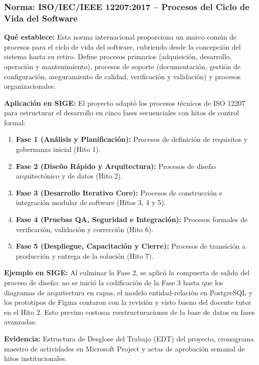 \documentclass[12pt,a4paper]{article}
\begin{document}
\subsubsection{Norma: ISO/IEC/IEEE 12207:2017 -- Procesos del Ciclo de Vida del Software}

\textbf{Qué establece:}
Esta norma internacional proporciona un marco común de procesos para el ciclo de vida del software, cubriendo desde la concepción del sistema hasta su retiro. Define procesos primarios (adquisición, desarrollo, operación y mantenimiento), procesos de soporte (documentación, gestión de configuración, aseguramiento de calidad, verificación y validación) y procesos organizacionales.

\textbf{Aplicación en SIGE:}
El proyecto adaptó los procesos técnicos de ISO 12207 para estructurar el desarrollo en cinco fases secuenciales con hitos de control formal:
\begin{enumerate}[leftmargin=1.5em, itemsep=2pt]
    \item \textbf{Fase 1 (Análisis y Planificación):} Procesos de definición de requisitos y gobernanza inicial (Hito 1).
    \item \textbf{Fase 2 (Diseño Rápido y Arquitectura):} Procesos de diseño arquitectónico y de datos (Hito 2).
    \item \textbf{Fase 3 (Desarrollo Iterativo Core):} Procesos de construcción e integración modular de software (Hitos 3, 4 y 5).
    \item \textbf{Fase 4 (Pruebas QA, Seguridad e Integración):} Procesos formales de verificación, validación y corrección (Hito 6).
    \item \textbf{Fase 5 (Despliegue, Capacitación y Cierre):} Procesos de transición a producción y entrega de la solución (Hito 7).
\end{enumerate}

\textbf{Ejemplo en SIGE:}
Al culminar la Fase 2, se aplicó la compuerta de salida del proceso de diseño: no se inició la codificación de la Fase 3 hasta que los diagramas de arquitectura en capas, el modelo entidad-relación en PostgreSQL y los prototipos de Figma contaron con la revisión y visto bueno del docente tutor en el Hito 2. Esto previno costosas reestructuraciones de la base de datos en fases avanzadas.

\textbf{Evidencia:}
Estructura de Desglose del Trabajo (EDT) del proyecto, cronograma maestro de actividades en Microsoft Project y actas de aprobación semanal de hitos institucionales.
\end{document}

